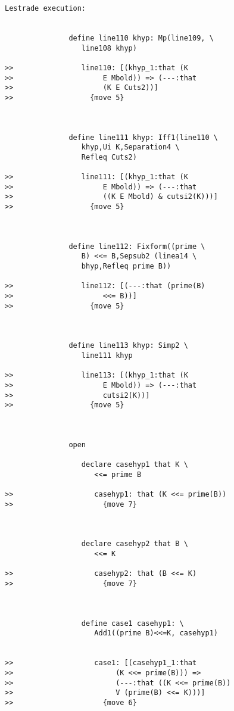 \documentclass[12pt]{article}
\begin{document}
\begin{verbatim}Lestrade execution:


               define line110 khyp: Mp(line109, \
                  line108 khyp)

>>                line110: [(khyp_1:that (K
>>                     E Mbold)) => (---:that
>>                     (K E Cuts2))]
>>                  {move 5}



               define line111 khyp: Iff1(line110 \
                  khyp,Ui K,Separation4 \
                  Refleq Cuts2)

>>                line111: [(khyp_1:that (K
>>                     E Mbold)) => (---:that
>>                     ((K E Mbold) & cutsi2(K)))]
>>                  {move 5}



               define line112: Fixform((prime \
                  B) <<= B,Sepsub2 (linea14 \
                  bhyp,Refleq prime B))

>>                line112: [(---:that (prime(B)
>>                     <<= B))]
>>                  {move 5}



               define line113 khyp: Simp2 \
                  line111 khyp

>>                line113: [(khyp_1:that (K
>>                     E Mbold)) => (---:that
>>                     cutsi2(K))]
>>                  {move 5}



               open

                  declare casehyp1 that K \
                     <<= prime B

>>                   casehyp1: that (K <<= prime(B))
>>                     {move 7}



                  declare casehyp2 that B \
                     <<= K

>>                   casehyp2: that (B <<= K)
>>                     {move 7}



                  define case1 casehyp1: \
                     Add1((prime B)<<=K, casehyp1)


>>                   case1: [(casehyp1_1:that
>>                        (K <<= prime(B))) =>
>>                        (---:that ((K <<= prime(B))
>>                        V (prime(B) <<= K)))]
>>                     {move 6}




\end{verbatim}
\end{document}
